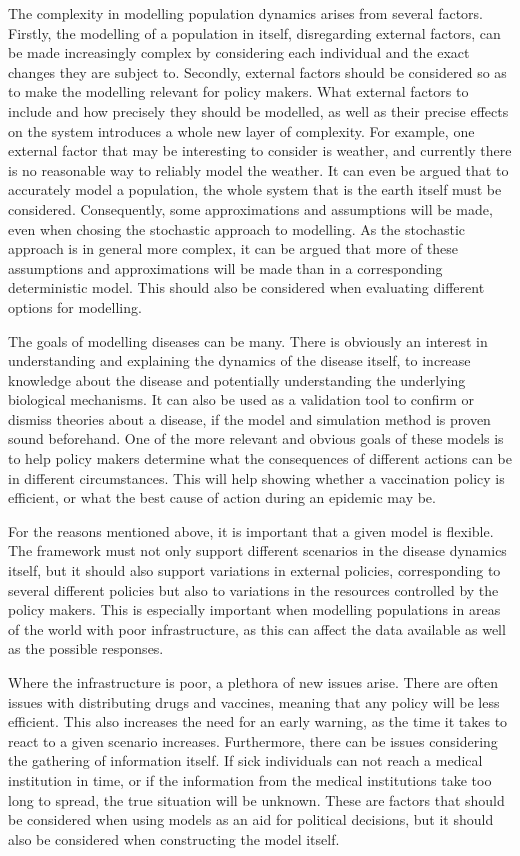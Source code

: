 \documentclass[10pt,a4paper]{article}
\begin{document}
The complexity in modelling population dynamics arises from several factors. Firstly, the modelling of a population in itself, disregarding external factors, can be made increasingly complex by considering each individual and the exact changes they are subject to. Secondly, external factors should be considered so as to make the modelling relevant for policy makers. What external factors to include and how precisely they should be modelled, as well as their precise effects on the system introduces a whole new layer of complexity. For example, one external factor that may be interesting to consider is weather, and currently there is no reasonable way to reliably model the weather. It can even be argued that to accurately model a population, the whole system that is the earth itself must be considered. Consequently, some approximations and assumptions will be made, even when chosing the stochastic approach to modelling. As the stochastic approach is in general more complex, it can be argued that more of these assumptions and approximations will be made than in a corresponding deterministic model. This should also be considered when evaluating different options for modelling.

The goals of modelling diseases can be many. There is obviously an interest in understanding and explaining the dynamics of the disease itself, to increase knowledge about the disease and potentially understanding the underlying biological mechanisms. It can also be used as a validation tool to confirm or dismiss theories about a disease, if the model and simulation method is proven sound beforehand. One of the more relevant and obvious goals of these models is to help policy makers determine what the consequences of different actions can be in different circumstances. This will help showing whether a vaccination policy is efficient, or what the best cause of action during an epidemic may be.

For the reasons mentioned above, it is important that a given model is flexible. The framework must not only support different scenarios in the disease dynamics itself, but it should also support variations in external policies, corresponding to several different policies but also to variations in the resources controlled by the policy makers. This is especially important when modelling populations in areas of the world with poor infrastructure, as this can affect the data available as well as the possible responses.

Where the infrastructure is poor, a plethora of new issues arise. There are often issues with distributing drugs and vaccines, meaning that any policy will be less efficient. This also increases the need for an early warning, as the time it takes to react to a given scenario increases. Furthermore, there can be issues considering the gathering of information itself. If sick individuals can not reach a medical institution in time, or if the information from the medical institutions take too long to spread, the true situation will be unknown. These are factors that should be considered when using models as an aid for political decisions, but it should also be considered when constructing the model itself.
\end{document}

